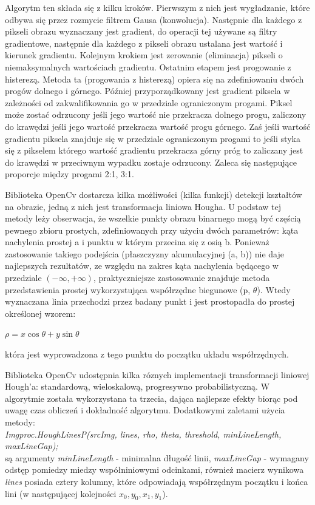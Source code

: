 \documentclass[a4paper,12pt]{article}
\begin{document}
		        Algorytm ten składa się z kilku kroków. Pierwszym z nich jest wygładzanie, które odbywa się przez rozmycie filtrem Gausa (konwolucja). Następnie dla każdego z pikseli obrazu wyznaczany jest gradient, do operacji tej używane są filtry gradientowe, następnie dla każdego z pikseli obrazu ustalana jest wartość i kierunek gradientu. Kolejnym krokiem jest zerowanie (eliminacja) pikseli o niemaksymalnych wartościach gradientu. Ostatnim etapem jest progowanie z histerezą. Metoda ta (progowania z histerezą) opiera się na zdefiniowaniu dwóch progów dolnego i górnego. Później przyporządkowany jest gradient piksela w zależności od zakwalifikowania go w przedziale ograniczonym progami. Piksel może zostać odrzucony jeśli jego wartość nie przekracza dolnego progu, zaliczony do krawędzi jeśli jego wartość przekracza wartość progu górnego. Zaś jeśli wartość gradientu piksela znajduje się w przedziale ograniczonym progami to jeśli styka się z pikselem którego wartość gradientu przekracza górny próg to zaliczany jest do krawędzi w przeciwnym wypadku zostaje odrzucony. Zaleca się następujące proporcje między progami 2:1, 3:1.
		         \par
		
        		Biblioteka OpenCv dostarcza kilka możliwości (kilka funkcji) detekcji kształtów na obrazie, jedną z nich jest transformacja liniowa Hougha. U podstaw tej metody leży obserwacja, że wszelkie punkty obrazu binarnego mogą być częścią pewnego zbioru prostych, zdefiniowanych przy użyciu dwóch parametrów: kąta nachylenia prostej a i punktu w którym przecina się z osią b. 
		        Ponieważ zastosowanie takiego podejścia (płaszczyzny akumulacyjnej (a, b)) nie daje najlepszych rezultatów, ze względu na zakres kąta nachylenia będącego w przedziale $(-\infty, +\infty)$, praktyczniejsze zastosowanie znajduje metoda przedstawienia prostej wykorzystująca współrzędne biegunowe (p, $\theta$). Wtedy wyznaczana linia przechodzi przez badany punkt i jest prostopadła do prostej określonej wzorem:
		        \begin{center}
		        $\rho = x \cos \theta + y \sin \theta$ 
		        \end{center} 
		        która jest wyprowadzona z tego punktu do początku układu współrzędnych.
		
		        Biblioteka OpenCv udostępnia kilka róznych implementacji transformacji liniowej Hough'a: standardową, wieloskalową, progresywno probabilistyczną.
		        W algorytmie została wykorzystana ta trzecia, dająca najlepsze efekty biorąc pod uwagę czas obliczeń i dokładność algorytmu. Dodatkowymi zaletami użycia metody:\\ \textit {Imgproc.HoughLinesP(srcImg, lines, rho, theta, threshold, minLineLength, maxLineGap);}\\
		        są argumenty \textit{minLineLength} - minimalna długość linii, \textit{maxLineGap} - wymagany odstęp pomiedzy miedzy współniniowymi odcinkami, również macierz wynikowa \textit{lines} posiada cztery kolumny, które odpowiadają współrzędnym początku i końca lini (w następującej kolejności $ x_0, y_0, x_1, y_1 $).
		
\end{document}
